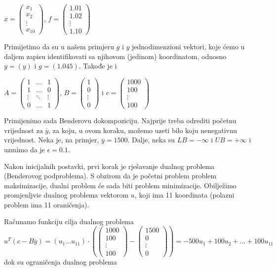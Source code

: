 \documentclass[a4paper, utf8, 11pt, colorlinks]{book}
\theoremstyle{definition}
\begin{document}
$x=\left(\begin{array}{c}
	x_1 \\
	x_2 \\
	\vdots \\
	x_{10}
\end{array}\right)$,  
$f = \left(\begin{array}{c}
	1.01 \\
	1.02 \\
	\vdots \\
	1.10
\end{array}\right)$

Primijetimo da su u našem primjeru $g$ i $y$ jednodimenzioni vektori, koje ćemo u daljem zapisu identifikovati sa njihovom (jedinom) koordinatom, odnosno
$y=(y)$ i $g=(1.045)$. Takođe je i 

$A=\left(
\begin{array}{ccc}
	1 & \ldots & 1 \\
	1 & \ldots & 0 \\
	\vdots & \ddots & \vdots \\
	0 & \ldots & 1
\end{array}\right)$, \quad
$B=\left(\begin{array}{c}
	1 \\
	0 \\
	\vdots \\
	0
\end{array}\right)$ i \quad 
$c=\left(\begin{array}{c}
	1000 \\
	100 \\
	\vdots \\
	100
\end{array}\right)$ 


Primijenimo sada Benderovu dokompoziciju. Najprije treba odrediti početnu vrijednost za $\overline{y}$, za koju, u ovom koraku, možemo uzeti bilo koju nenegativnu vrijednost. Neka je, na primjer, $\overline{y}=1500$. Dalje, neka su $LB=-\infty$ i $UB=+\infty$ i uzmimo da je $\epsilon = 0.1$.

 Nakon inicijalnih postavki, prvi korak je rješavanje dualnog problema (Benderovog podproblema). S obzirom da je početni problem problem maksimizacije, dualni problem će sada biti problem minimizacije. Obilježimo promjenljvie dualnog problema vektorom  $u$, koji ima 11 koordinata (polazni problem ima 11 oraničenja).
 
 Računamo funkciju cilja dualnog problema
 $$
u^T (c-B\overline{y})=(u_1\ldots u_{11})\cdot \left(\left(\begin{array}{c}
	1000 \\
	100 \\
	\vdots \\
	100
\end{array}\right)-\left(\begin{array}{c}
1500 \\
0 \\
\vdots \\
0
\end{array}\right)\right) = -500u_1+100u_2+\ldots+100u_{11}
$$
dok su ograničenja dualnog problema
\end{document}
